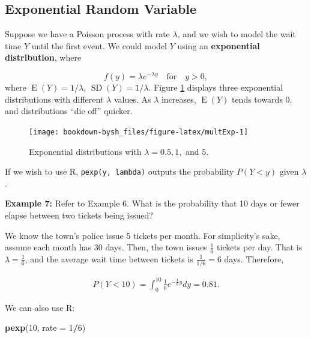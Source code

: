 \documentclass[
]{krantz}
\newenvironment{Shaded}{\begin{snugshade}}{\end{snugshade}}
\newcommand{\DataTypeTok}[1]{\textcolor[rgb]{0.27,0.27,0.27}{#1}}
\newcommand{\DecValTok}[1]{\textcolor[rgb]{0.06,0.06,0.06}{#1}}
\newcommand{\KeywordTok}[1]{\textcolor[rgb]{0.27,0.27,0.27}{\textbf{#1}}}
\newcommand{\NormalTok}[1]{#1}
\newcommand{\OperatorTok}[1]{\textcolor[rgb]{0.43,0.43,0.43}{\textbf{#1}}}
\newcommand{\E}{\operatorname{E}}
\newcommand{\SD}{\operatorname{SD}}
\begin{document}
\hypertarget{exponential-random-variable}{%
\subsection{Exponential Random Variable}\label{exponential-random-variable}}

Suppose we have a Poisson process with rate \(\lambda\), and we wish to model the wait time \(Y\) until the first event. We could model \(Y\) using an \textbf{exponential distribution},  where

\begin{equation}
f(y) = \lambda e^{-\lambda y} \quad \textrm{for} \quad y > 0,
\label{eq:expRV}
\end{equation}
where \(\E(Y) = 1/\lambda\), \(\SD(Y) = 1/\lambda\). Figure \ref{fig:multExp} displays three exponential distributions with different \(\lambda\) values. As \(\lambda\) increases, \(\E(Y)\) tends towards 0, and distributions ``die off'' quicker.



\begin{figure}

{\centering \texttt{[image: bookdown-bysh\_files/figure-latex/multExp-1]} 

}

\caption{Exponential distributions with \(\lambda = 0.5, 1,\) and \(5\).}\label{fig:multExp}
\end{figure}

If we wish to use R, \texttt{pexp(y,\ lambda)} outputs the probability \(P(Y < y)\) given \(\lambda\).

\textbf{Example 7:} Refer to Example 6. What is the probability that 10 days or fewer elapse between two tickets being issued?

We know the town's police issue 5 tickets per month. For simplicity's sake, assume each month has 30 days. Then, the town issues \(\frac{1}{6}\) tickets per day. That is \(\lambda = \frac{1}{6}\), and the average wait time between tickets is \(\frac{1}{1/6} = 6\) days. Therefore,

\begin{align*}
P(Y < 10) = \int_{0}^{10} \textstyle \frac16 e^{-\frac16y} dy = 0.81.
\end{align*}

We can also use R:

\begin{Shaded}
\begin{Highlighting}[]
\KeywordTok{pexp}\NormalTok{(}\DecValTok{10}\NormalTok{, }\DataTypeTok{rate =} \DecValTok{1}\OperatorTok{/}\DecValTok{6}\NormalTok{)}
\end{Highlighting}
\end{Shaded}
\end{document}
